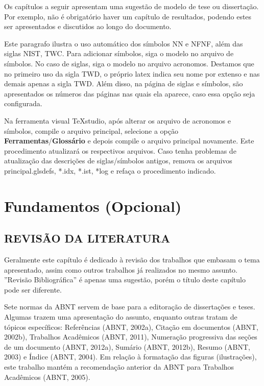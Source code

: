 Os capítulos a seguir apresentam uma sugestão de modelo de tese ou dissertação. Por exemplo, não é obrigatório haver um capítulo de resultados, podendo estes ser apresentados e discutidos ao longo do documento.

Este paragrafo ilustra o uso automático dos símbolos \gls{NN} e \gls{NFNF}, além das siglas \gls{NIST}, \gls{TWC}. Para adicionar símbolos, siga o modelo no arquivo de símbolos. No caso de siglas, siga o modelo no arquivo acronomos. Destamos que no primeiro uso da sigla \gls{TWD}, o próprio latex indica seu nome por extenso e nas demais apenas a sigla \gls{TWD}. Além disso, na página de siglas e símbolos, são apresentados os números das páginas nas quais ela aparece, caso essa opção seja configurada.

Na ferramenta visual TeXstudio, após alterar os arquivo de acronomos e símbolos, compile o arquivo principal, selecione a opção \textbf{Ferramentas}/\textbf{Glossário} e depois compile o arquivo principal novamente. Este procedimento atualizará os respectivos arquivos. Caso tenha problemas de atualização das descrições de siglas/símbolos antigos, remova os arquivos principal.glsdefs, *.idx, *.ist, *log e refaça o procedimento indicado.

	 
\nolinenumbers
\part{Fundamentos (Opcional)}
\linenumbers

%

\chapter{REVISÃO DA LITERATURA}
\label{cap:cap01}

Geralmente este capítulo é dedicado à revisão dos trabalhos que embasam o tema apresentado, assim como outros trabalhos já realizados no mesmo assunto. ”Revisão Bibliográfica” é apenas uma sugestão, porém o título deste capítulo pode ser diferente.

Sete normas da ABNT servem de base para a editoração de dissertações e teses. Algumas trazem uma apresentação do assunto, enquanto outras tratam de tópicos específicos: Referências (ABNT, 2002a), Citação em documentos (ABNT, 2002b), Trabalhos Acadêmicos (ABNT, 2011), Numeração progressiva das seções de um documento (ABNT, 2012a), Sumário (ABNT, 2012b), Resumo (ABNT, 2003) e Índice (ABNT, 2004). Em relação à formatação das figuras (ilustrações), este trabalho mantém a recomendação anterior da ABNT para Trabalhos Acadêmicos (ABNT, 2005).


